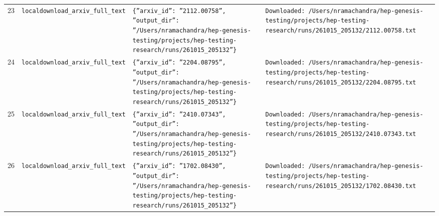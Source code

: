 \documentclass[11pt,a4paper]{article}
\begin{document}
\begin{longtable}{@{}p{}p{}p{}p{}@{}}
23 & \texttt{local}\newline\texttt{download\_\allowbreak{}arxiv\_\allowbreak{}full\_\allowbreak{}text} & \texttt{\{''arxiv\_\allowbreak{}id'':\allowbreak{} ''2112.00758'',\allowbreak{} ''output\_\allowbreak{}dir'':\allowbreak{} ''/\allowbreak{}Users/\allowbreak{}nramachandra/\allowbreak{}hep-genesis-testing/\allowbreak{}projects/\allowbreak{}hep-testing-research/\allowbreak{}runs/\allowbreak{}261015\_\allowbreak{}205132''\}\allowbreak{}} & \texttt{Downloaded:\allowbreak{} /\allowbreak{}Users/\allowbreak{}nramachandra/\allowbreak{}hep-genesis-testing/\allowbreak{}projects/\allowbreak{}hep-testing-research/\allowbreak{}runs/\allowbreak{}261015\_\allowbreak{}205132/\allowbreak{}2112.00758.txt} \\
24 & \texttt{local}\newline\texttt{download\_\allowbreak{}arxiv\_\allowbreak{}full\_\allowbreak{}text} & \texttt{\{''arxiv\_\allowbreak{}id'':\allowbreak{} ''2204.08795'',\allowbreak{} ''output\_\allowbreak{}dir'':\allowbreak{} ''/\allowbreak{}Users/\allowbreak{}nramachandra/\allowbreak{}hep-genesis-testing/\allowbreak{}projects/\allowbreak{}hep-testing-research/\allowbreak{}runs/\allowbreak{}261015\_\allowbreak{}205132''\}\allowbreak{}} & \texttt{Downloaded:\allowbreak{} /\allowbreak{}Users/\allowbreak{}nramachandra/\allowbreak{}hep-genesis-testing/\allowbreak{}projects/\allowbreak{}hep-testing-research/\allowbreak{}runs/\allowbreak{}261015\_\allowbreak{}205132/\allowbreak{}2204.08795.txt} \\
25 & \texttt{local}\newline\texttt{download\_\allowbreak{}arxiv\_\allowbreak{}full\_\allowbreak{}text} & \texttt{\{''arxiv\_\allowbreak{}id'':\allowbreak{} ''2410.07343'',\allowbreak{} ''output\_\allowbreak{}dir'':\allowbreak{} ''/\allowbreak{}Users/\allowbreak{}nramachandra/\allowbreak{}hep-genesis-testing/\allowbreak{}projects/\allowbreak{}hep-testing-research/\allowbreak{}runs/\allowbreak{}261015\_\allowbreak{}205132''\}\allowbreak{}} & \texttt{Downloaded:\allowbreak{} /\allowbreak{}Users/\allowbreak{}nramachandra/\allowbreak{}hep-genesis-testing/\allowbreak{}projects/\allowbreak{}hep-testing-research/\allowbreak{}runs/\allowbreak{}261015\_\allowbreak{}205132/\allowbreak{}2410.07343.txt} \\
26 & \texttt{local}\newline\texttt{download\_\allowbreak{}arxiv\_\allowbreak{}full\_\allowbreak{}text} & \texttt{\{''arxiv\_\allowbreak{}id'':\allowbreak{} ''1702.08430'',\allowbreak{} ''output\_\allowbreak{}dir'':\allowbreak{} ''/\allowbreak{}Users/\allowbreak{}nramachandra/\allowbreak{}hep-genesis-testing/\allowbreak{}projects/\allowbreak{}hep-testing-research/\allowbreak{}runs/\allowbreak{}261015\_\allowbreak{}205132''\}\allowbreak{}} & \texttt{Downloaded:\allowbreak{} /\allowbreak{}Users/\allowbreak{}nramachandra/\allowbreak{}hep-genesis-testing/\allowbreak{}projects/\allowbreak{}hep-testing-research/\allowbreak{}runs/\allowbreak{}261015\_\allowbreak{}205132/\allowbreak{}1702.08430.txt} \\

\end{longtable}
\end{document}
